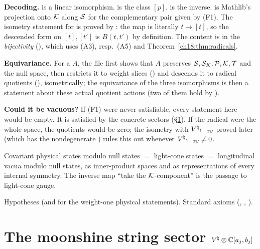 \begin{dictionary}
\textbf{Decoding.}   is a linear isomorphism.   is the class
$[p]$.   is the inverse.   is Mathlib's
projection onto $\mathcal{K}$ along $\mathcal{S}$ for the complementary pair given by (F1).  The isometry statement for
 is proved by : the map is literally $t\mapsto[t]$, so the
descended form on $[t],[t']$ is $B(t,t')$ by definition.  The content is in the \emph{bijectivity}
(), which uses (A3), resp.\ (A5) and Theorem~\ref{ch18:thm:radicals}.

\textbf{Equivariance.}  For a  $A$, the file  first shows that
$A$ preserves $\mathcal{S},\mathcal{S}_K,\mathcal{P},\mathcal{K},\mathcal{T}$ and the null space, then restricts it to weight slices
() and descends it to radical quotients (),
isometrically; the equivariance of the three isomorphisms is then a statement about these actual
quotient actions (two of them hold by ).

\textbf{Could it be vacuous?}  If (F1) were never satisfiable, every statement here would be empty.  It
is satisfied by the concrete sectors (\S\ref{ch18:sec:sector}).  If the radical were the whole space, the
quotients would be zero; the isometry with ${V^{\natural}}_{1-xy}$ proved later (which has the nondegenerate
) rules this out whenever ${V^{\natural}}_{1-xy}\neq0$.
\end{dictionary}
\begin{physics}
Covariant physical states modulo null states $=$ light-cone states $=$ longitudinal vacua modulo null
states, as inner-product spaces and as representations of every internal symmetry.  The inverse map
``take the $\mathcal{K}$-component'' is the passage to light-cone gauge.
\end{physics}
\begin{status}
Hypotheses  (and  for the weight-one physical statements).  Standard axioms
(, ,
).
\end{status}

\section{The moonshine string sector \texorpdfstring{${V^{\natural}}\otimes\mathbb C[a_j,b_j]$}{V-natural tensor C[a,b]}}\label{ch18:sec:sector}

